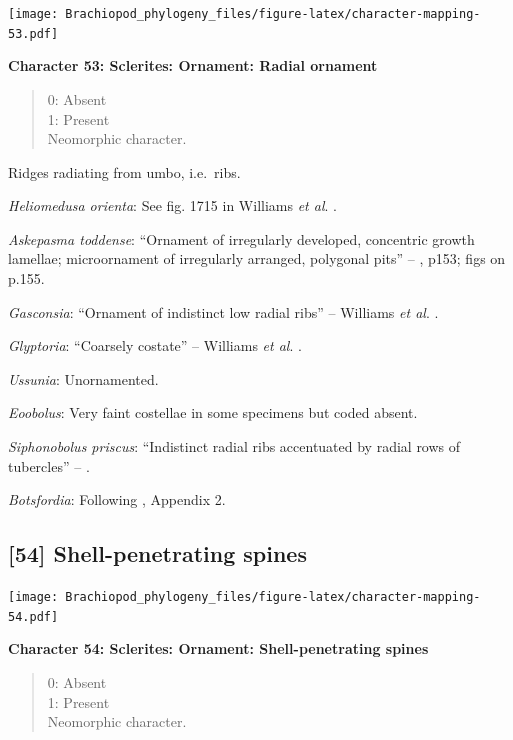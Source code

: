 \documentclass[openany]{book}
\theoremstyle{definition}
\theoremstyle{definition}
\theoremstyle{definition}
\theoremstyle{remark}
\begin{document}
\texttt{[image: Brachiopod\_phylogeny\_files/figure-latex/character-mapping-53.pdf]}

\textbf{Character 53: Sclerites: Ornament: Radial ornament}

\begin{quote}
0: Absent\\
1: Present\\
Neomorphic character.
\end{quote}

Ridges radiating from umbo, i.e.~ribs.

\emph{Heliomedusa orienta}: See fig. 1715 in Williams \emph{et al}.
\citeyearpar{Williams2007PartH}.

\emph{Askepasma toddense}: ``Ornament of irregularly developed,
concentric growth lamellae; microornament of irregularly arranged,
polygonal pits'' -- \citet{Williams2000BrachiopodaLinguliformea}, p153;
figs on p.155.

\emph{Gasconsia}: ``Ornament of indistinct low radial ribs'' -- Williams
\emph{et al}. \citeyearpar[p167]{Williams2000BrachiopodaLinguliformea}.

\emph{Glyptoria}: ``Coarsely costate'' -- Williams \emph{et al}.
\citeyearpar[p710]{Williams2000BrachiopodaLinguliformea}.

\emph{Ussunia}: Unornamented.

\emph{Eoobolus}: Very faint costellae in some specimens but coded
absent.

\emph{Siphonobolus priscus}: ``Indistinct radial ribs accentuated by
radial rows of tubercles'' -- \citet{Popov2009Earlyontogeny}.

\emph{Botsfordia}: Following \citet{Williams1998Thediversity}, Appendix
2.

\hypertarget{shell-penetrating-spines}{%
\subsection*{{[}54{]} Shell-penetrating
spines}\label{shell-penetrating-spines}}

\texttt{[image: Brachiopod\_phylogeny\_files/figure-latex/character-mapping-54.pdf]}

\textbf{Character 54: Sclerites: Ornament: Shell-penetrating spines}

\begin{quote}
0: Absent\\
1: Present\\
Neomorphic character.
\end{quote}
\end{document}
